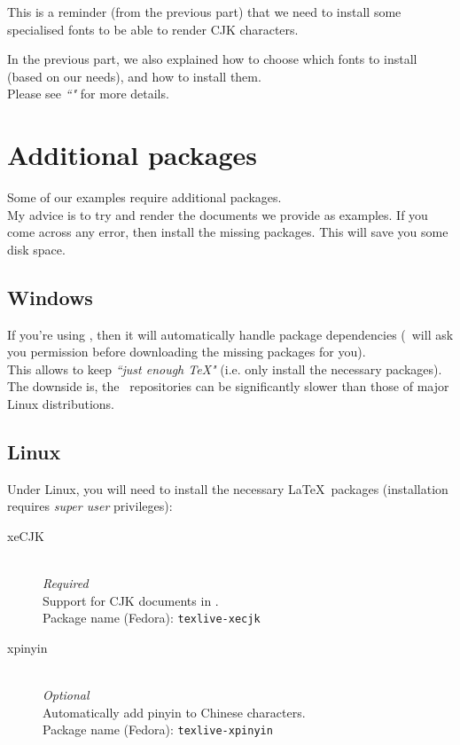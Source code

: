 This is a reminder (from the previous part) that we need to install some specialised fonts to be able to render CJK characters. \

In the previous part, we also explained how to choose which fonts to install (based on our needs), and how to install them. \\

Please see \emph{``"} for more details. \\


\section*{Additional packages}

Some of our examples require additional packages. \\

My advice is to try and render the documents we provide as examples. If you come across any error, then install the missing packages. This will save you some disk space.

\subsection*{Windows}

If you're using \MiKTeX, then it will automatically handle package dependencies (\MiKTeX\ will ask you permission before downloading the missing packages for you). \\

This allows to keep \emph{``just enough TeX"} (i.e. only install the necessary packages).
The downside is, the \MiKTeX\ repositories can be significantly slower than those of major Linux distributions.


\subsection*{Linux}

Under Linux, you will need to install the necessary \LaTeX\ packages (installation requires \emph{super user} privileges):

\begin{description}
	\item[xeCJK] \mbox{} \\ 
	\emph{Required} \\
	Support for CJK documents in \XeLaTeX. \citep{xecjk} \\
	Package name (Fedora): \texttt{texlive-xecjk}

	\item[xpinyin] \mbox{} \\
	\emph{Optional} \\
	Automatically add pinyin to Chinese characters. \citep{xpinyin} \\
	Package name (Fedora): \texttt{texlive-xpinyin}
\end{description}

